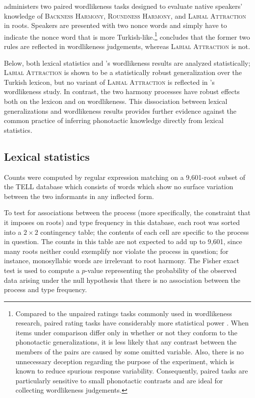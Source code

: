 \citet[311]{Zimmer1969} administers two paired wordlikeness tasks designed to evaluate native speakers' knowledge of \textsc{Backness Harmony}, \textsc{Roundness Harmony}, and \textsc{Labial Attraction} in roots. Speakers are presented with two nonce words and simply have to indicate the nonce word that is more Turkish-like.\footnote{Compared to the unpaired ratings tasks  commonly used in wordlikeness research, paired rating tasks have considerably more statistical power \citep{Gigerenzer2004}. When items under comparison differ only in whether or not they conform to the phonotactic generalizations, it is less likely that any contrast between the members of the pairs are caused by some omitted variable. Also, there is no unnecessary deception regarding the purpose of the experiment, which is known to reduce spurious response variability. Consequently, paired tasks are particularly sensitive to small phonotactic contrasts and are ideal for collecting wordlikeness judgements.} \citeauthor{Zimmer1969} concludes that the former two rules are reflected in wordlikeness judgements, whereas \textsc{Labial Attraction} is not. 

Below, both lexical statistics and \citeauthor{Zimmer1969}'s wordlikeness results are analyzed statistically; \textsc{Labial Attraction} is shown to be a statistically robust generalization over the Turkish lexicon, but no variant of \textsc{Labial Attraction} is reflected in \citeauthor{Zimmer1969}'s wordlikeness study. In contrast, the two harmony processes have robust effects both on the lexicon and on wordlikeness.  This dissociation between lexical generalizations and wordlikeness results provides further evidence against the common practice of inferring phonotactic knowledge directly from lexical statistics.

\subsection{Lexical statistics}

Counts were computed by regular expression matching on a 9,601-root subset of the TELL database which consists of words which show no surface variation between the two informants in any inflected form.

To test for associations between the process (more specifically, the constraint that it imposes on roots) and type frequency in this database, each root was sorted into a $2 \times 2$ contingency table; the contents of each cell are specific to the process in question. The counts in this table are not expected to add up to 9,601, since many roots neither could exemplify nor violate the process in question; for instance, monosyllabic words are irrelevant to root harmony. The Fisher exact test is used to compute a $p$-value representing the probability of the observed data arising under the null hypothesis that there is no association between the process and type frequency.

